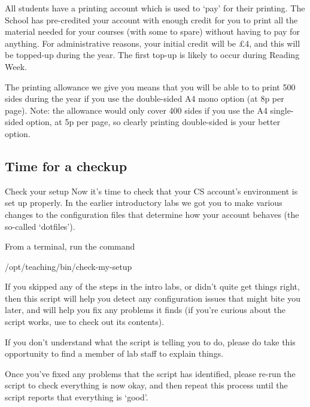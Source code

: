 All students have a printing account which is used to `pay' for their printing. The School has pre-credited your account with enough credit for you to print all the material needed for your courses (with some to spare) without having to pay for anything. For administrative reasons, your initial credit will be \pounds4, and this will be topped-up during the year. The first top-up is likely to occur during Reading Week.

The printing allowance we give you means that you will be able to to print 500 sides during the year if you use the double-sided A4 mono option (at 8p per page). Note: the allowance would only cover 400 sides if you use the A4 single-sided option, at 5p per page, so clearly printing double-sided is your better option.

\begin{firstonly}
  
\subsection{Time for a checkup}
\label{sec:time-checkup}

\begin{roadblock}{Check your setup}
Now it's time to check that your CS account's environment is set up properly. In the earlier
introductory labs we got you to make various changes to the configuration files that determine how your account behaves (the so-called `dotfiles').


From a terminal, run the command

\begin{ttoutenv}
/opt/teaching/bin/check-my-setup
  \end{ttoutenv}


If you skipped any of the steps in the intro labs, or didn't quite get things right, then this script will help you detect any configuration issues that might bite you later, and will help you fix any problems it finds (if you're curious about the script works, use  to check out its contents).


If you don't understand what the script is telling you to do, please do take this opportunity to find a member of lab staff to explain things.

Once you've fixed any problems that the script has identified, please re-run the script to check everything is now okay, and then repeat this process until the script reports that everything is `good'.

\end{roadblock}

\end{firstonly}

